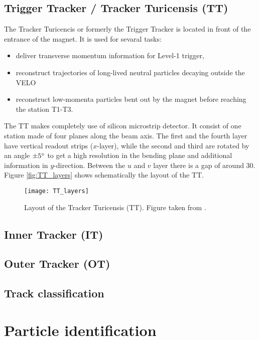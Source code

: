 \subsection{Trigger Tracker / Tracker Turicensis (TT)}
The Tracker Turicencis or formerly the Trigger Tracker is located in front of the entrance of the \lhcb magnet. It is used for sevaral tasks:
\begin{itemize}
    \item deliver transverse momentum information for Level-1 trigger,
    \item reconstruct trajectories of long-lived neutral particles decaying outside the VELO
    \item reconstruct low-momenta particles bent out by the magnet before reaching the station T1-T3.
\end{itemize}

The TT makes completely use of silicon microstrip detector. It consist of one station made of four planes along the beam axis. The first and the fourth layer have vertical readout strips ($x$-layer), while the second and third are rotated by an angle $\pm 5^{\circ}$ to get a high resolution in the
bending plane and additional information in $y$-direction.
Between the $u$ and $v$ layer there is a gap of around 30\cm. Figure \ref{fig:TT_layers} shows schematically the layout of the TT.
\begin{figure}[hptb]
    \centering
	\texttt{[image: TT\_layers]}	
	\caption{Layout of the Tracker Turicensis (TT). 
             Figure taken from \cite{ST_Performance}.}
	\label{fig:fig_layers}
\end{figure}

\subsection{Inner Tracker (IT)}

\subsection{Outer Tracker (OT)}

\subsection{Track classification}


\section{Particle identification}


